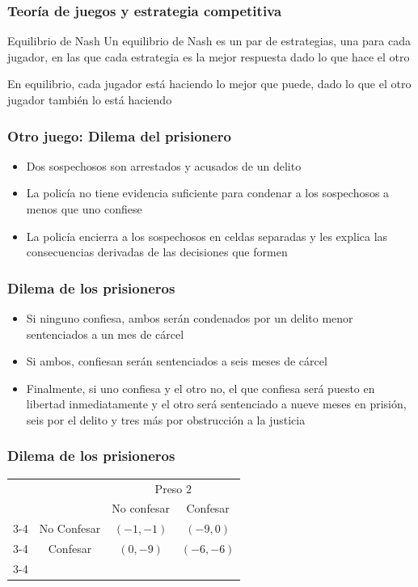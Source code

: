 \documentclass{beamer}
\begin{document}
\begin{frame}
\frametitle{Teoría de juegos y estrategia competitiva}
\begin{block}{Equilibrio de Nash}
Un equilibrio de Nash es un par de estrategias, una para cada jugador, en las que cada estrategia es la mejor respuesta dado lo que hace el otro
\end{block}
\vspace{5mm}
En equilibrio, cada jugador está haciendo lo mejor que puede, dado lo que el otro jugador también lo está haciendo
\end{frame}


\begin{frame}
\frametitle{Otro juego: Dilema del prisionero}
\begin{itemize}
\item Dos sospechosos son arrestados y acusados de un delito
\item La policía no tiene evidencia suficiente para condenar a los sospechosos a menos que uno confiese
\item La policía encierra a los sospechosos en celdas separadas y les explica las consecuencias derivadas de las decisiones que formen
\end{itemize}
\end{frame}

\begin{frame}
\frametitle{Dilema de los prisioneros}
\begin{itemize}
\item Si ninguno confiesa, ambos serán condenados por un delito menor sentenciados a un mes de cárcel
\item Si ambos, confiesan serán sentenciados a seis meses de cárcel
\item Finalmente, si uno confiesa y el otro no, el que confiesa será puesto en libertad inmediatamente y el otro
será sentenciado a nueve meses en prisión, seis por el delito y tres más por obstrucción a la justicia
\end{itemize}
\end{frame}

\begin{frame}
\frametitle{Dilema de los prisioneros}
\begin{table}
     \begin{tabular}{cc|c|c|}
      & \multicolumn{1}{c}{} & \multicolumn{2}{c}{Preso $2$}\\
      & \multicolumn{1}{c}{} & \multicolumn{1}{c}{No confesar}  & \multicolumn{1}{c}{Confesar} \\\cline{3-4}
      \multirow{}{Preso $1$}  & No Confesar & $(-1,-1)$ & $(-9,0)$ \\\cline{3-4}
      & Confesar & $(0,-9)$ & $(-6,-6)$ \\\cline{3-4}
    \end{tabular}
  \end{table}
\end{frame}
\end{document}
